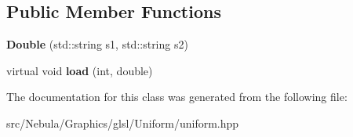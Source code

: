 \subsection*{\-Public \-Member \-Functions}
\begin{DoxyCompactItemize}
\item 
\hypertarget{classNeb_1_1glsl_1_1Uniform_1_1Vector_1_1Double_a4f5b3ffeff4c2d183a7af7401c434731}{{\bfseries \-Double} (std\-::string s1, std\-::string s2)}\label{classNeb_1_1glsl_1_1Uniform_1_1Vector_1_1Double_a4f5b3ffeff4c2d183a7af7401c434731}

\item 
\hypertarget{classNeb_1_1glsl_1_1Uniform_1_1Vector_1_1Double_a8e4ae1631ba13b00afede31a82d91481}{virtual void {\bfseries load} (int, double)}\label{classNeb_1_1glsl_1_1Uniform_1_1Vector_1_1Double_a8e4ae1631ba13b00afede31a82d91481}

\end{DoxyCompactItemize}


\-The documentation for this class was generated from the following file\-:\begin{DoxyCompactItemize}
\item 
src/\-Nebula/\-Graphics/glsl/\-Uniform/uniform.\-hpp\end{DoxyCompactItemize}
